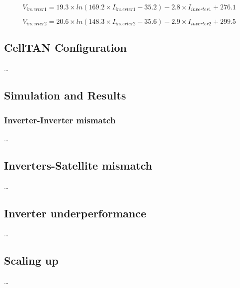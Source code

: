 $$
    V_{inverter1} = 19.3 \times ln(169.2 \times I_{inverter1} - 35.2) - 2.8 \times I_{inverter1} + 276.1
$$

$$
    V_{inverter2} = 20.6 \times ln(148.3 \times I_{inverter2} - 35.6) - 2.9 \times I_{inverter2} + 299.5 
$$

\subsection{CellTAN Configuration}

\dots

\subsection{Simulation and Results} \label{subsec:results}

\subsubsection{Inverter-Inverter mismatch}

\dots

\subsection{Inverters-Satellite mismatch}

\dots

\subsection{Inverter underperformance}

\dots

\subsection{Scaling up}

\dots


